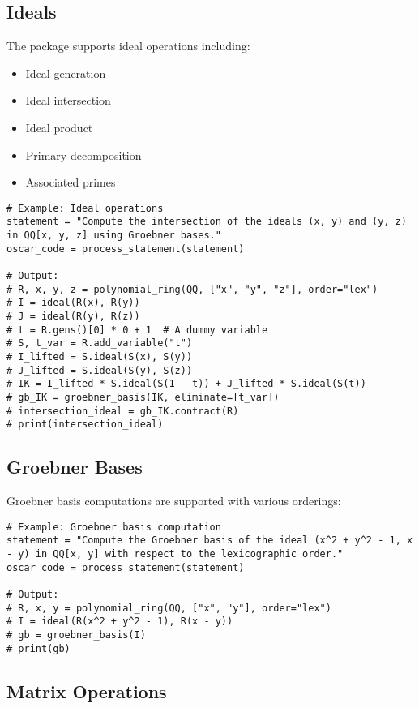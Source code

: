 \documentclass[11pt,a4paper]{article}
\begin{document}
\subsection{Ideals}

The package supports ideal operations including:

\begin{itemize}
    \item Ideal generation
    \item Ideal intersection
    \item Ideal product
    \item Primary decomposition
    \item Associated primes
\end{itemize}

\begin{lstlisting}
# Example: Ideal operations
statement = "Compute the intersection of the ideals (x, y) and (y, z) in QQ[x, y, z] using Groebner bases."
oscar_code = process_statement(statement)

# Output:
# R, x, y, z = polynomial_ring(QQ, ["x", "y", "z"], order="lex")
# I = ideal(R(x), R(y))
# J = ideal(R(y), R(z))
# t = R.gens()[0] * 0 + 1  # A dummy variable
# S, t_var = R.add_variable("t")
# I_lifted = S.ideal(S(x), S(y))
# J_lifted = S.ideal(S(y), S(z))
# IK = I_lifted * S.ideal(S(1 - t)) + J_lifted * S.ideal(S(t))
# gb_IK = groebner_basis(IK, eliminate=[t_var])
# intersection_ideal = gb_IK.contract(R)
# print(intersection_ideal)
\end{lstlisting}

\subsection{Groebner Bases}

Groebner basis computations are supported with various orderings:

\begin{lstlisting}
# Example: Groebner basis computation
statement = "Compute the Groebner basis of the ideal (x^2 + y^2 - 1, x - y) in QQ[x, y] with respect to the lexicographic order."
oscar_code = process_statement(statement)

# Output:
# R, x, y = polynomial_ring(QQ, ["x", "y"], order="lex")
# I = ideal(R(x^2 + y^2 - 1), R(x - y))
# gb = groebner_basis(I)
# print(gb)
\end{lstlisting}

\subsection{Matrix Operations}
\end{document}
